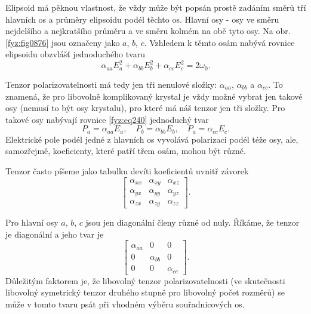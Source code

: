     Elipsoid má pěknou vlastnost, že vždy může být popsán prostě zadáním směrů tří hlavních os a
    průměry elipsoidu podél těchto os. Hlavní osy - osy ve směru nejdelšího a nejkratšího průměru a
    ve směru kolmém na obě tyto osy. Na obr. \ref{fyz:fig0876} jsou označeny jako \(a\), \(b\),
    \(c\). Vzhledem k těmto osám nabývá rovnice elipsoidu obzvlášť jednoduchého tvaru
    \begin{equation*}
      \alpha_{aa}E_a^2 + \alpha_{bb}E_b^2 + \alpha_{cc}E_c^2= 2\omega_0.
    \end{equation*}

    Tenzor polarizovatelnosti má tedy jen tři nenulové složky: \(\alpha_{aa}\), \(\alpha_{bb}\) a
    \(\alpha_{cc}\). To znamená, že pro libovolně komplikovaný krystal je vždy možné vybrat jen
    takové osy (nemusí to být osy krystalu), pro které má náš tenzor jen tři složky. Pro takové osy
    nabývají rovnice \eqref{fyz:eq240} jednoduchý tvar
    \begin{equation}\label{fyz:eq832}
      P_a = \alpha_{aa}E_a,\quad P_b = \alpha_{bb}E_b,\quad P_a = \alpha_{cc}E_c.
    \end{equation}
    Elektrické pole podél jedné z hlavních os vyvolává polarizaci podél téže osy, ale, samozřejmě,
    koeficienty, které patří třem osám, mohou být různé.

    Tenzor často píšeme jako tabulku devíti koeficientů uvnitř závorek
    \begin{equation}\label{fyz:eq938} 
      \begin{bmatrix}
        \alpha_{xx}& \alpha_{xy}& \alpha_{xz} \\
        \alpha_{yx}& \alpha_{yy}& \alpha_{yz} \\
        \alpha_{zx}& \alpha_{zy}& \alpha_{zz}
      \end{bmatrix}.
    \end{equation}

    Pro hlavní osy \(a\), \(b\), \(c\) jsou jen diagonální členy různé od nuly. Říkáme, že tenzor je
    diagonální a jeho tvar je
    \begin{equation}\label{fyz:eq939}
      \begin{bmatrix}
        \alpha_{aa}&      0      &      0      \\
             0     & \alpha_{bb} &      0      \\
             0     &      0      & \alpha_{cc}
      \end{bmatrix}.
    \end{equation}
    Důležitým faktorem je, že libovolný tenzor polarizovatelnosti (ve skutečnosti libovolný
    symetrický tenzor druhého stupně pro libovolný počet rozměrů) se může v tomto tvaru psát při
    vhodném výběru souřadnicových os.
    
